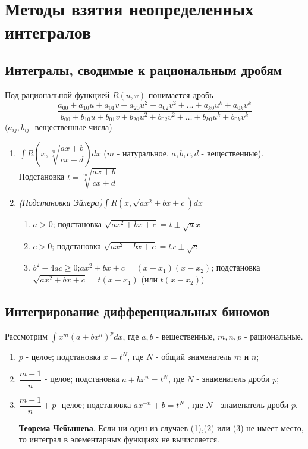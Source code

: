 \documentclass[a4paper,12pt]{scrartcl}
\begin{document}
\section{Методы взятия неопределенных интегралов}
\subsection{Интегралы, сводимые к рациональным дробям}

Под рациональной функцией $R(u,v)$ понимается дробь 
$$\dfrac{a_{00} + a_{10}u + a_{01}v + a_{20}u^2 + a_{02}v^2 + \ldots + a_{k0}u^k + a_{0k}v^k}{b_{00} + b_{10}u + b_{01}v + b_{20}u^2 + b_{02}v^2 + \ldots + b_{k0}u^k + b_{0k}v^k}$$
$(a_{ij},b_{ij}$- вещественные числа)
\begin{enumerate} 
 \item $\int R\left(x,\sqrt[m]{\dfrac{ax+b}{cx+d}}\right)dx$ ($m$ - натуральное, $a,b,c,d$ - вещественные). Подстановка $ t = \sqrt[m]{\dfrac{ax+b}{cx+d}}$
\item \emph{(Подстановки Эйлера)}$\int R(x, \sqrt{ax^2 + bx +c})dx$
\begin{enumerate}
\item$a > 0$; подстановка $\sqrt{ax^2 + bx +c} = t \pm \sqrt{a}x$
\item$c > 0$; подстановка $\sqrt{ax^2 + bx +c} = tx \pm \sqrt{c}$
\item$b^2 - 4ac \geqslant 0$;$  ax^2 + bx +c = (x-x_1)(x-x_2)$; подстановка $\sqrt{ax^2 + bx +c} = t(x - x_1)$ (или $t(x - x_2)$)
\end{enumerate}
\end{enumerate}
\subsection{Интегрирование дифференциальных биномов}
Рассмотрим $\int x^m (a + bx^n)^pdx$, где $a,b$ - вещественные, $m,n,p$ -  рациональные.
\begin{enumerate}
\item $p$ - целое; подстановка $x = t^N$, где $N$ - общий знаменатель $m$ и $n$; 
\item $\dfrac{m+1}{n}$ - целое; подстановка $a +bx^n = t^N$, где $N$ - знаменатель дроби $p$;
\item $\dfrac{m+1}{n} +p$- целое; подстановка $ax^{-n}+b = t^N$ , где $N$ - знаменатель дроби $p$.

{\bfseries Теорема Чебышева}. Если ни один из случаев (1),(2) или (3) не имеет место, то интеграл в элементарных функциях не вычисляется.
\end{enumerate}
\end{document}
